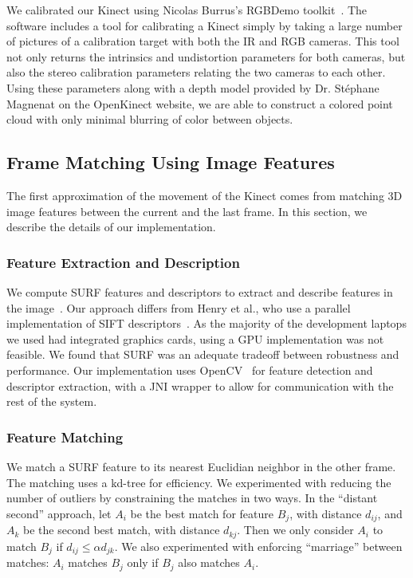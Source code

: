 \documentclass[letterpaper, 10pt, conference]{ieeeconf}
\begin{document}
We calibrated our Kinect using Nicolas Burrus's RGBDemo
toolkit~\cite{BurrusCalibration}. The software includes a tool for calibrating
a Kinect simply by taking a large number of pictures of a calibration target
with both the IR and RGB cameras. This tool not only returns the intrinsics
and undistortion parameters for both cameras, but also the stereo calibration
parameters relating the two cameras to each other. Using these parameters
along with a depth model provided by Dr. St\'{e}phane Magnenat on the
OpenKinect website, we are able to construct a colored point cloud with only
minimal blurring of color between objects.

\subsection{Frame Matching Using Image Features}
The first approximation of the movement of the Kinect comes from matching 3D image
features between the current and the last frame. In this section, we describe the details
of our implementation.

\subsubsection{Feature Extraction and Description}
We compute SURF features and descriptors
to extract and describe features in the image~\cite{Bay06surf}. Our approach differs
from Henry et al., who use a parallel implementation of SIFT descriptors~\cite{SIFTGPU}.
As the majority of the development laptops we used had integrated graphics cards, using
a GPU implementation was not feasible. We found that SURF was an adequate tradeoff
between robustness and performance. Our implementation uses OpenCV~\cite{opencv_library}
for feature detection and descriptor extraction, with a JNI wrapper to allow for
communication with the rest of the system.

\subsubsection{Feature Matching}
We match a SURF feature to its nearest Euclidian neighbor in the other frame. The matching
uses a kd-tree for efficiency. We experimented with reducing the number of outliers by
constraining the matches in two ways. In the ``distant second'' approach, let $A_i$ be the
best match for feature $B_j$, with distance $d_{ij}$, and $A_k$ be the second best match,
with distance $d_{kj}$. Then we only consider $A_i$ to match $B_j$ if $d_{ij} \le \alpha d_{jk}$.
We also experimented with enforcing ``marriage'' between matches: $A_i$ matches $B_j$ only if
$B_j$ also matches $A_i$.
\end{document}
